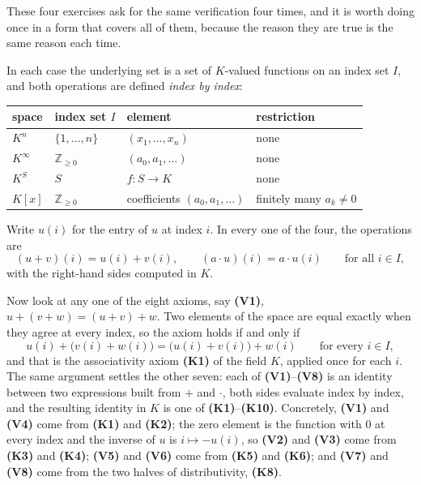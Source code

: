 \begin{exercisesolution}
\label{sol:kn_axioms}
These four exercises ask for the same verification four times, and it is worth doing once in a form that covers all of them, because the reason they are true is the same reason each time.

In each case the underlying set is a set of $K$-valued functions on an index set $I$, and both operations are defined \emph{index by index}:
\begin{center}
\begin{tabular}{|l|l|l|l|}
\hline
space & index set $I$ & element & restriction \\
\hline
$K^n$ & $\{1, \dots, n\}$ & $(x_1, \dots, x_n)$ & none \\
$K^\infty$ & $\mathbb{Z}_{\ge 0}$ & $(a_0, a_1, \dots)$ & none \\
$K^S$ & $S$ & $f \colon S \to K$ & none \\
$K[x]$ & $\mathbb{Z}_{\ge 0}$ & coefficients $(a_0, a_1, \dots)$ & finitely many $a_k \neq 0$ \\
\hline
\end{tabular}
\end{center}
Write $u(i)$ for the entry of $u$ at index $i$. In every one of the four, the operations are
\[
    (u + v)(i) = u(i) + v(i), \qquad (a \cdot u)(i) = a \cdot u(i) \qquad \text{for all } i \in I,
\]
with the right-hand sides computed in $K$.

Now look at any one of the eight axioms, say \textbf{(V1)}, $u + (v + w) = (u + v) + w$. Two elements of the space are equal exactly when they agree at every index, so the axiom holds if and only if
\[
    u(i) + \bigl(v(i) + w(i)\bigr) = \bigl(u(i) + v(i)\bigr) + w(i) \qquad \text{for every } i \in I,
\]
and that is the associativity axiom \textbf{(K1)} of the field $K$, applied once for each $i$. The same argument settles the other seven: each of \textbf{(V1)}--\textbf{(V8)} is an identity between two expressions built from $+$ and $\cdot$, both sides evaluate index by index, and the resulting identity in $K$ is one of \textbf{(K1)}--\textbf{(K10)}. Concretely, \textbf{(V1)} and \textbf{(V4)} come from \textbf{(K1)} and \textbf{(K2)}; the zero element is the function with $0$ at every index and the inverse of $u$ is $i \mapsto -u(i)$, so \textbf{(V2)} and \textbf{(V3)} come from \textbf{(K3)} and \textbf{(K4)}; \textbf{(V5)} and \textbf{(V6)} come from \textbf{(K5)} and \textbf{(K6)}; and \textbf{(V7)} and \textbf{(V8)} come from the two halves of distributivity, \textbf{(K8)}.


\end{exercisesolution}
